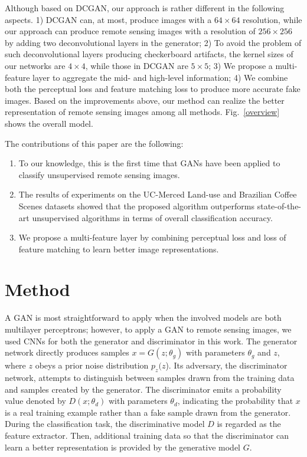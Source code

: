 \documentclass[journal]{IEEEtran}
\begin{document}
Although based on DCGAN, our approach is rather different in the following aspects. 1) DCGAN can, at most, produce images with a $64\times64$ resolution, while our approach can produce remote sensing images with a resolution of $256\times256$ by adding two deconvolutional layers in the generator; 
2) To avoid the problem of such deconvolutional layers producing checkerboard artifacts, the kernel sizes of our networks are $4\times4$, while those in DCGAN are $5\times5$; 3) We propose a multi-feature layer to aggregate the mid- and high-level information; 4) We combine both the perceptual loss and feature matching loss to produce more accurate fake images. Based on the improvements above, our method can realize the better representation of remote sensing images among all methods. Fig.~\ref{overview} shows the overall model.




The contributions of this paper are the following:

\begin{enumerate}
	\item To our knowledge, this is the first time that GANs have been applied to classify unsupervised remote sensing images.
	\item The results of experiments on the UC-Merced Land-use and Brazilian Coffee Scenes datasets showed that the proposed algorithm outperforms state-of-the-art unsupervised algorithms in terms of overall classification accuracy.
	\item We propose a multi-feature layer by combining perceptual loss and loss of feature matching to learn better image representations.
\end{enumerate}










\section{Method}


\label{sec:method}
A GAN is most straightforward to apply when the involved models are both multilayer perceptrons; however, to apply a GAN to remote sensing images, we used CNNs for both the generator and discriminator in this work. The generator network directly produces samples $x=G(z;\theta_g)$ with parameters $\theta_g$ and $z$, where $z$ obeys a prior noise distribution $p_z(z$). Its adversary, the discriminator network, attempts to distinguish between samples drawn from the training data and samples created by the generator. The discriminator emits a probability value denoted by $D(x;\theta_d)$ with parameters $\theta_d$, indicating the probability that $x$ is a real training example rather than a fake sample drawn from the generator. During the classification task, the discriminative model $D$ is regarded as the feature extractor. Then, additional training data so that the discriminator can learn a better representation is provided by the generative model $G$.
\vspace{-1em}
\end{document}
